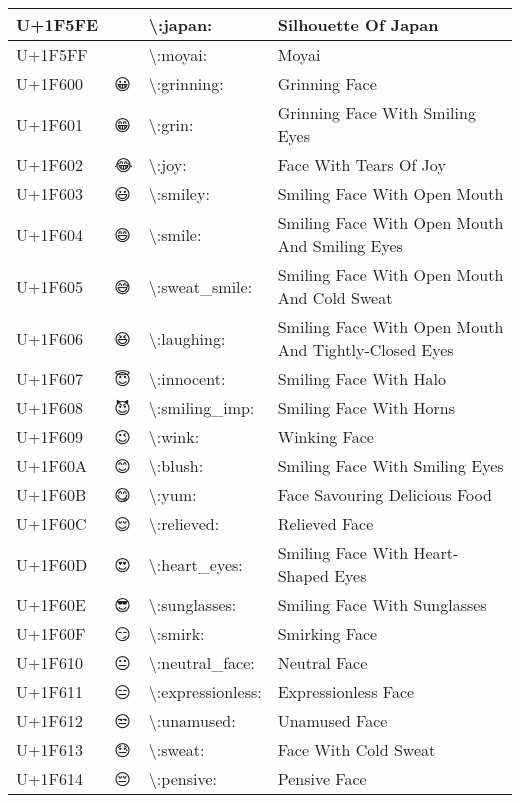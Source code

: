 \begin{table}[h]
\begin{tabulary}{\linewidth}{|L|L|L|L|}
\hline
U+1F5FE & 🗾 & {\textbackslash}:japan: & Silhouette Of Japan \\
\hline
U+1F5FF & 🗿 & {\textbackslash}:moyai: & Moyai \\
\hline
U+1F600 & 😀 & {\textbackslash}:grinning: & Grinning Face \\
\hline
U+1F601 & 😁 & {\textbackslash}:grin: & Grinning Face With Smiling Eyes \\
\hline
U+1F602 & 😂 & {\textbackslash}:joy: & Face With Tears Of Joy \\
\hline
U+1F603 & 😃 & {\textbackslash}:smiley: & Smiling Face With Open Mouth \\
\hline
U+1F604 & 😄 & {\textbackslash}:smile: & Smiling Face With Open Mouth And Smiling Eyes \\
\hline
U+1F605 & 😅 & {\textbackslash}:sweat\_smile: & Smiling Face With Open Mouth And Cold Sweat \\
\hline
U+1F606 & 😆 & {\textbackslash}:laughing: & Smiling Face With Open Mouth And Tightly-Closed Eyes \\
\hline
U+1F607 & 😇 & {\textbackslash}:innocent: & Smiling Face With Halo \\
\hline
U+1F608 & 😈 & {\textbackslash}:smiling\_imp: & Smiling Face With Horns \\
\hline
U+1F609 & 😉 & {\textbackslash}:wink: & Winking Face \\
\hline
U+1F60A & 😊 & {\textbackslash}:blush: & Smiling Face With Smiling Eyes \\
\hline
U+1F60B & 😋 & {\textbackslash}:yum: & Face Savouring Delicious Food \\
\hline
U+1F60C & 😌 & {\textbackslash}:relieved: & Relieved Face \\
\hline
U+1F60D & 😍 & {\textbackslash}:heart\_eyes: & Smiling Face With Heart-Shaped Eyes \\
\hline
U+1F60E & 😎 & {\textbackslash}:sunglasses: & Smiling Face With Sunglasses \\
\hline
U+1F60F & 😏 & {\textbackslash}:smirk: & Smirking Face \\
\hline
U+1F610 & 😐 & {\textbackslash}:neutral\_face: & Neutral Face \\
\hline
U+1F611 & 😑 & {\textbackslash}:expressionless: & Expressionless Face \\
\hline
U+1F612 & 😒 & {\textbackslash}:unamused: & Unamused Face \\
\hline
U+1F613 & 😓 & {\textbackslash}:sweat: & Face With Cold Sweat \\
\hline
U+1F614 & 😔 & {\textbackslash}:pensive: & Pensive Face \\

\end{tabulary}
\end{table}
